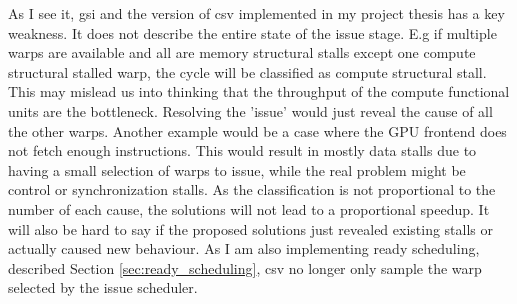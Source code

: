 As I see it, \acrshort{gsi} and the version of \acrshort{csv} implemented in my project thesis has a key weakness. It does not describe the entire state of the issue stage. E.g if multiple warps are available and all are memory structural stalls except one compute structural stalled warp, the cycle will be classified as compute structural stall. This may mislead us into thinking that the throughput of the compute functional units are the bottleneck. Resolving the 'issue' would just reveal the cause of all the other warps. Another example would be a case where the GPU frontend does not fetch enough instructions. This would result in mostly data stalls due to having a small selection of warps to issue, while the real problem might be control or synchronization stalls. As the classification is not proportional to the number of each cause, the solutions will not lead to a proportional speedup. It will also be hard to say if the proposed solutions just revealed existing stalls or actually caused new behaviour. As I am also implementing ready scheduling, described Section \ref{sec:ready_scheduling}, \acrshort{csv} no longer only sample the warp selected by the issue scheduler.

